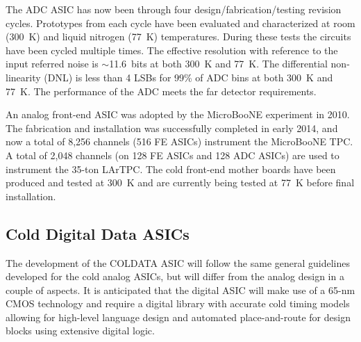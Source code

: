  The ADC ASIC has now been through four design/fabrication/testing revision cycles.
Prototypes from each cycle have been evaluated and characterized at room (300~K) and liquid nitrogen (77~K) temperatures.
During these tests the circuits have been cycled multiple times.
The effective resolution with reference to the input referred noise is $\sim$11.6~bits at both 300~K and 77~K.
The differential non-linearity (DNL) is less than 4 LSBs for 99\% of ADC bins at both 300~K and 77~K.
The performance of the ADC meets the far detector requirements.

An analog front-end ASIC was adopted by the MicroBooNE experiment in 2010. 
The fabrication and installation was successfully completed in early 2014, and now 
a total of 8,256 channels (516 FE ASICs) instrument the MicroBooNE TPC. 
A total of 2,048 channels (on 128 FE ASICs and 128 ADC ASICs) are used to instrument the 35-ton 
LArTPC. 
The cold front-end mother boards have been produced and tested at 300~K and are currently
being tested at 77~K before final installation. %


%
\subsection{Cold Digital Data ASICs}
\label{subsec:fe_CMOS_digital}

The development of the COLDATA ASIC will follow the same general guidelines developed for the cold analog ASICs, but
will differ from the analog design in a couple of aspects.
It is anticipated that the digital ASIC will make use of a 65-nm CMOS technology and require a
digital library with accurate cold timing models allowing for high-level language design and
automated place-and-route  for design blocks using extensive digital logic.  

